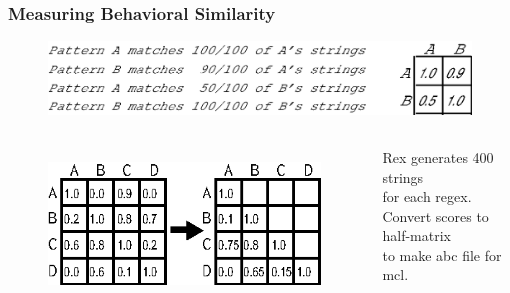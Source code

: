 \begin{frame}
\frametitle{Measuring Behavioral Similarity}
\begin{figure}[ht]
  \centering
  \includegraphics[scale=0.65]{nontex/illustrations/minimalMatrix.eps}
  \label{fig:minimalMatrix}
\end{figure}

\begin{columns}[t] %
\begin{figure}[h]
  \centering
  \includegraphics[scale=1]{nontex/illustrations/matrixToGraph.eps}
  \label{fig:matrixToGraph}
\end{figure}
\begin{center}
Rex generates 400 strings\\
for each regex.\\
Convert scores to half-matrix\\
to make abc file for mcl.
\end{center}
\end{columns}
\end{frame}



